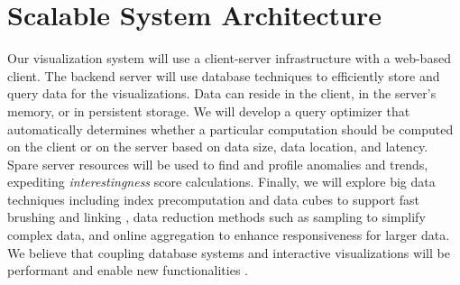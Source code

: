 \section*{Scalable System Architecture}

Our visualization system will use a client-server infrastructure with a web-based client. The backend server will use database techniques to efficiently store and query data for the visualizations. Data can reside in the client, in the server's memory, or in persistent storage.  We will develop a query optimizer that automatically determines whether a particular computation should be computed on the client or on the server based on data size, data location, and latency.
Spare server resources will be used to find and profile anomalies and trends, expediting \textit{interestingness} score calculations.
Finally, we will explore big data techniques including index precomputation and data cubes to support fast brushing and linking \cite{liu:immens, lins:nanocubes}, data reduction methods such as sampling to simplify complex data, and online aggregation \cite{hellerstein:onlineagg, agarwal:blinkdb, fisher:trustme} to enhance responsiveness for larger data. We believe that coupling database systems and interactive visualizations will be performant and enable new functionalities \cite{wu:dvms}.
